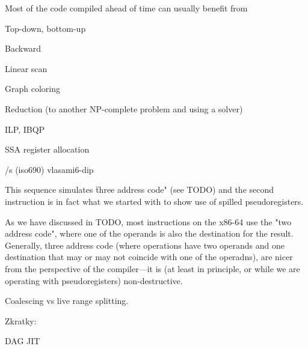 Most of the code compiled ahead
of time can usually benefit from
\enditems

\secc Top-down, bottom-up

\secc Backward

\secc Linear scan

\secc Graph coloring

\secc Reduction (to another NP-complete problem and using a solver)

ILP, IBQP

\secc SSA register allocation


\bibchap
\usebib/s (iso690) vlasami6-dip

\bye

This sequence simulates \"three address code" (see TODO) and the second instruction
is in fact what we started with to show use of spilled pseudoregisters.


As we have discussed in TODO, most instructions on
the x86-64 use the "two address code", where one of the operands is also the
destination for the result. Generally, three address code (where operations have
two operands and one destination that may or may not coincide with one of the
operadns), are nicer from the perspective of the compiler---it is (at least in
principle, or while we are operating with pseudoregisters) non-destructive.





Coalescing vs live range splitting.



Zkratky:

DAG
JIT
